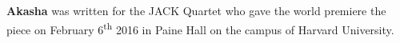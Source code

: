 \textbf{Akasha} was written for the JACK Quartet who gave the world premiere
the piece on February 6\textsuperscript{th} 2016 in Paine Hall on the campus of
Harvard University.
